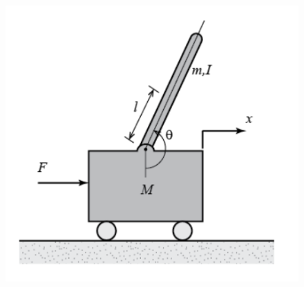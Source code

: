 \documentclass{ieeeaccess}
\begin{document}
\begin{figure}[h!]
\centering
\includegraphics[scale=0.5]{pendulo.PNG}
\label{diagram}
\end{figure}
\end{document}
